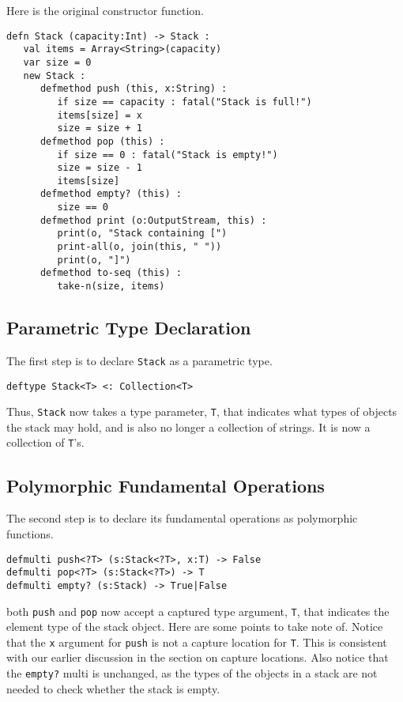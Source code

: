 \documentclass[10pt,oneside]{book}
\begin{document}
Here is the original constructor function.
\begin{lstlisting}
defn Stack (capacity:Int) -> Stack :
   val items = Array<String>(capacity)
   var size = 0
   new Stack :
      defmethod push (this, x:String) :
         if size == capacity : fatal("Stack is full!")
         items[size] = x
         size = size + 1
      defmethod pop (this) :
         if size == 0 : fatal("Stack is empty!")
         size = size - 1
         items[size]
      defmethod empty? (this) :
         size == 0
      defmethod print (o:OutputStream, this) :
         print(o, "Stack containing [")
         print-all(o, join(this, " "))
         print(o, "]")
      defmethod to-seq (this) :
         take-n(size, items)
\end{lstlisting}

\subsection*{Parametric Type Declaration}
The first step is to declare \texttt{\frenchspacing Stack} as a parametric type. 
\begin{lstlisting}
deftype Stack<T> <: Collection<T>
\end{lstlisting}
Thus, \texttt{\frenchspacing Stack} now takes a type parameter, \texttt{\frenchspacing T}, that indicates what types of objects the stack may hold, and is also no longer a collection of strings. It is now a collection of \texttt{\frenchspacing T}'s. 

\subsection*{Polymorphic Fundamental Operations}
The second step is to declare its fundamental operations as polymorphic functions.
\begin{lstlisting}
defmulti push<?T> (s:Stack<?T>, x:T) -> False
defmulti pop<?T> (s:Stack<?T>) -> T
defmulti empty? (s:Stack) -> True|False
\end{lstlisting}
both \texttt{\frenchspacing push} and \texttt{\frenchspacing pop} now accept a captured type argument, \texttt{\frenchspacing T}, that indicates the element type of the stack object. Here are some points to take note of. Notice that the \texttt{\frenchspacing x} argument for \texttt{\frenchspacing push} is not a capture location for \texttt{\frenchspacing T}. This is consistent with our earlier discussion in the section on capture locations. Also notice that the \texttt{\frenchspacing empty?} multi is unchanged, as the types of the objects in a stack are not needed to check whether the stack is empty.
\end{document}

